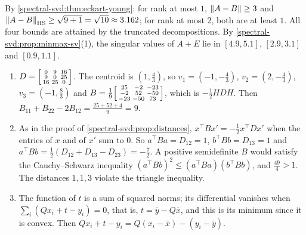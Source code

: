 By \cref{spectral-svd:thm:eckart-young}: for rank at most $1$,
$\left\|A - B\right\|\geq3$ and
$\left\|A - B\right\|_{\mathrm{HS}}\geq\sqrt{9 + 1} = \sqrt{10}\approx3.162$; for
rank at most $2$, both are at least $1$. All four bounds are attained by
the truncated decompositions. By
\cref{spectral-svd:prop:minmax-sv}(1), the singular values of $A + E$ lie
in $[4.9, 5.1]$, $[2.9, 3.1]$ and $[0.9, 1.1]$.

\begin{enumerate}[nosep]
  \item $D = \begin{bsmallmatrix}0 & 9 & 16\\ 9 & 0 & 25\\ 16 & 25 & 0
        \end{bsmallmatrix}$. The centroid is $(1, \frac43)$, so
        $v_1 = (-1, -\frac43)$, $v_2 = (2, -\frac43)$,
        $v_3 = (-1, \frac83)$ and
        $B = \frac19\begin{bsmallmatrix}25 & -2 & -23\\ -2 & 52 & -50\\
        -23 & -50 & 73\end{bsmallmatrix}$, which is $-\frac12HDH$. Then
        $B_{11} + B_{22} - 2B_{12} = \frac{25 + 52 + 4}9 = 9$.
  \item As in the proof of \cref{spectral-svd:prop:distances},
        $x^\top Bx' = -\frac12x^\top Dx'$ when the entries of $x$ and
        of $x'$ sum to $0$. So $a^\top Ba = D_{12} = 1$,
        $b^\top Bb = D_{13} = 1$ and
        $a^\top Bb = \frac12(D_{12} + D_{13} - D_{23}) = -\frac72$. A
        positive semidefinite $B$ would satisfy the Cauchy--Schwarz
        inequality $(a^\top Bb)^2\leq(a^\top Ba)(b^\top Bb)$, and
        $\frac{49}4 > 1$. The distances $1, 1, 3$ violate the triangle
        inequality.
  \item The function of $t$ is a sum of squared norms; its differential
        vanishes when $\sum_i(Qx_i + t - y_i) = 0$, that is,
        $t = \bar y - Q\bar x$, and this is its minimum since it is
        convex. Then $Qx_i + t - y_i = Q(x_i - \bar x) - (y_i - \bar y)$.
\end{enumerate}

\section{}

